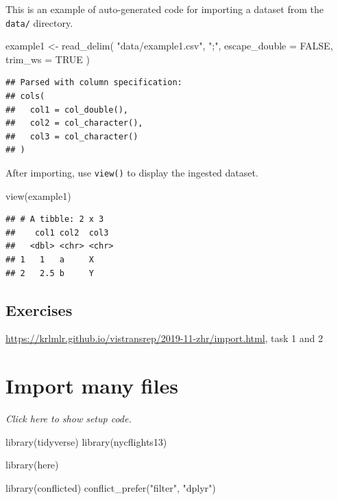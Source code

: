 \documentclass[]{book}
\newenvironment{Shaded}{}{}
\newcommand{\DataTypeTok}[1]{#1}
\newcommand{\KeywordTok}[1]{\textcolor[rgb]{0.00,0.00,1.00}{#1}}
\newcommand{\NormalTok}[1]{#1}
\newcommand{\OtherTok}[1]{\textcolor[rgb]{1.00,0.25,0.00}{#1}}
\newcommand{\StringTok}[1]{\textcolor[rgb]{0.00,0.50,0.50}{#1}}
\begin{document}
This is an example of auto-generated code for importing a dataset from the \texttt{data/} directory.

\begin{Shaded}
\begin{Highlighting}[]
\NormalTok{example1 <-}
\StringTok{  }\KeywordTok{read_delim}\NormalTok{(}
    \StringTok{"data/example1.csv"}\NormalTok{,}
    \StringTok{";"}\NormalTok{,}
    \DataTypeTok{escape_double =} \OtherTok{FALSE}\NormalTok{, }\DataTypeTok{trim_ws =} \OtherTok{TRUE}
\NormalTok{  )}
\end{Highlighting}
\end{Shaded}

\begin{verbatim}
## Parsed with column specification:
## cols(
##   col1 = col_double(),
##   col2 = col_character(),
##   col3 = col_character()
## )
\end{verbatim}

After importing, use \texttt{view()} to display the ingested dataset.

\begin{Shaded}
\begin{Highlighting}[]
\KeywordTok{view}\NormalTok{(example1)}
\end{Highlighting}
\end{Shaded}

\begin{verbatim}
## # A tibble: 2 x 3
##    col1 col2  col3 
##   <dbl> <chr> <chr>
## 1   1   a     X    
## 2   2.5 b     Y
\end{verbatim}

\hypertarget{exercises-6}{%
\subsection*{Exercises}\label{exercises-6}}

\url{https://krlmlr.github.io/vistransrep/2019-11-zhr/import.html}, task 1 and 2

\hypertarget{import-many-files}{%
\section{Import many files}\label{import-many-files}}

\emph{Click here to show setup code.}

\begin{Shaded}
\begin{Highlighting}[]
\KeywordTok{library}\NormalTok{(tidyverse)}
\KeywordTok{library}\NormalTok{(nycflights13)}

\KeywordTok{library}\NormalTok{(here)}

\KeywordTok{library}\NormalTok{(conflicted)}
\KeywordTok{conflict_prefer}\NormalTok{(}\StringTok{"filter"}\NormalTok{, }\StringTok{"dplyr"}\NormalTok{)}
\end{Highlighting}
\end{Shaded}
\end{document}

